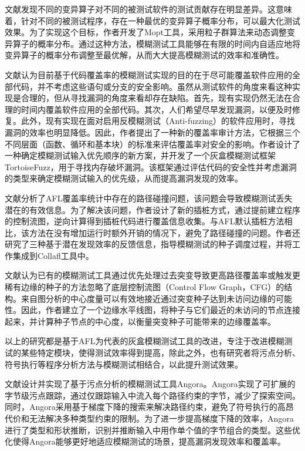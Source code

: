\documentclass[master]{thesis-uestc}
\begin{document}
文献\cite{lyu2019mopt}发现不同的变异算子对不同的被测试软件的测试贡献存在明显差异。这意味着，针对不同的被测试程序，存在一种最优的变异算子概率分布，可以最大化测试效果。为了实现这个目标，作者开发了Mopt工具，采用粒子群算法来动态调整变异算子的概率分布。通过这种方法，模糊测试工具能够在有限的时间内自适应地将变异算子的概率分布调整至最优解，从而大大提高模糊测试的效率和准确性。

文献\cite{wang2020not}认为目前基于代码覆盖率的模糊测试实现的目的在于尽可能覆盖软件应用的全部代码，并不考虑这些语句或分支的安全影响。虽然从测试软件的角度来看这种实现是合理的，但从寻找漏洞的角度来看却存在缺陷。首先，现有实现仍然无法在合理的时间内覆盖软件应用的全部代码。其次，人们希望尽早发现漏洞，以便及时修复。此外，现有实现在面对启用反模糊测试（Anti-fuzzing）的软件应用时，寻找漏洞的效率也明显降低。因此，作者提出了一种新的覆盖率审计方法，它根据三个不同层面（函数、循环和基本块）的标准来评估覆盖率对安全的影响。作者设计了一种确定模糊测试输入优先顺序的新方案，并开发了一个灰盒模糊测试框架TortoiseFuzz，用于寻找内存破坏漏洞。该框架通过评估代码的安全性并考虑漏洞的类型来确定模糊测试输入的优先级，从而提高漏洞发现的效率。

文献\cite{gan2018collafl}分析了AFL覆盖率统计中存在的路径碰撞问题，该问题会导致模糊测试丢失潜在的有效信息。为了解决该问题，作者设计了新的插桩方式，通过提前建立程序的控制流图，逆向计算得到插桩代码进行覆盖信息收集。与AFL默认插桩方法相比，该方法在没有增加运行时额外开销的情况下，避免了路径碰撞的问题。作者还研究了三种基于潜在发现效率的反馈信息，指导模糊测试的种子调度过程，并将工作集成到Collafl工具中。

文献\cite{she2022effective}认为已有的模糊测试工具通过优先处理过去突变导致更高路径覆盖率或触发更稀有边缘的种子的方法忽略了底层控制流图（Control Flow Graph，CFG）的结构。来自图分析的中心度量可以有效地接近通过突变种子达到未访问边缘的可能性。因此，作者建立了一个边缘水平线图，将种子与它们最近的未访问的节点连接起来，并计算种子节点的中心度，以衡量突变种子可能带来的边缘覆盖率。

以上的研究都是基于AFL为代表的灰盒模糊测试工具的改进，专注于改进模糊测试的某些特定模块，使得测试效率得到提高，除此之外，也有研究者将污点分析、符号执行等程序分析方法与模糊测试相结合，以此提升测试效果。

文献\cite{chen2018angora}设计并实现了基于污点分析的模糊测试工具Angora。Angora实现了可扩展的字节级污点跟踪，通过仅跟踪输入中流入每个路径约束的字节，减少了探索空间。同时，Angora采用基于梯度下降的搜索来解决路径约束，避免了符号执行的高昂代价和无法解决多种类型约束的限制。为了进一步提高梯度下降的效率，Angora进行了类型和形状推断，识别并推断输入中用作单个值的字节组合的类型。这些优化使得Angora能够更好地适应模糊测试的场景，提高漏洞发现效率和覆盖率。
\end{document}
